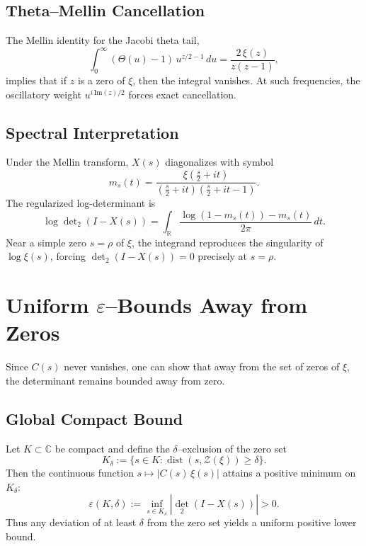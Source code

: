 \documentclass[11pt]{article}
\numberwithin{equation}{section}
\theoremstyle{definition}
\theoremstyle{remark}
\newcommand{\1}{\mathbbm{1}}
\begin{document}
\subsection{Theta--Mellin Cancellation}
The Mellin identity for the Jacobi theta tail,
\begin{equation}
\int_{0}^{\infty} (\Theta(u)-1) \, u^{z/2 - 1} \, du = \frac{2\, \xi(z)}{z(z-1)},
\end{equation}
implies that if $z$ is a zero of $\xi$, then the integral vanishes. At such frequencies, the oscillatory weight $u^{i\,\mathrm{Im}(z)/2}$ forces exact cancellation.

\subsection{Spectral Interpretation}
Under the Mellin transform, $X(s)$ diagonalizes with symbol
\begin{equation}
m_s(t) = \frac{\xi\left(\tfrac{s}{2}+it\right)}{\left(\tfrac{s}{2}+it\right)\left(\tfrac{s}{2}+it-1\right)}.
\end{equation}
The regularized log-determinant is
\begin{equation}
\log \det\nolimits_{2}(I - X(s)) = \int_{\mathbb{R}} \frac{\log(1-m_s(t)) - m_s(t)}{2\pi}\, dt.
\end{equation}
Near a simple zero $s=\rho$ of $\xi$, the integrand reproduces the singularity of $\log \xi(s)$, forcing $\det_2(I-X(s))=0$ precisely at $s=\rho$.

\section{Uniform $\varepsilon$--Bounds Away from Zeros}

Since $C(s)$ never vanishes, one can show that away from the set of zeros of $\xi$, the determinant remains bounded away from zero.

\subsection{Global Compact Bound}
Let $K\subset \mathbb{C}$ be compact and define the $\delta$--exclusion of the zero set
\begin{equation}
K_{\delta} := \{ s\in K : \operatorname{dist}(s, \mathcal{Z}(\xi)) \geq \delta \}.
\end{equation}
Then the continuous function $s \mapsto |C(s)\,\xi(s)|$ attains a positive minimum on $K_{\delta}$:
\begin{equation}
\varepsilon(K,\delta) := \inf_{s\in K_{\delta}} |\det_{2}(I - X(s))| > 0.
\end{equation}
Thus any deviation of at least $\delta$ from the zero set yields a uniform positive lower bound.
\end{document}
